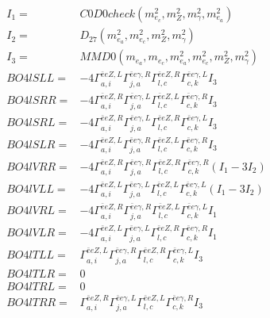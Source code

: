 \documentclass[A4,landscape]{article}
\begin{document}
\begin{align} 
I_1 = & C0D0check(m^2_{e_{{c}}}, m^2_{Z}, m^2_{\gamma}, m^2_{e_{{a}}}) \\ 
I_2 = & D_{27}(m^2_{e_{{a}}}, m^2_{e_{{c}}}, m^2_{Z}, m^2_{\gamma}) \\ 
I_3 = & MMD0(m_{e_{{a}}}, m_{e_{{c}}}, m^2_{e_{{a}}}, m^2_{e_{{c}}}, m^2_{Z}, m^2_{\gamma}) \\ 
  BO4lSLL= & -4  \Gamma^{\bar{e}e Z ,L}_{a, i} \Gamma^{\bar{e}e \gamma ,R}_{j, a} \Gamma^{\bar{e}e Z ,R}_{l, c} \Gamma^{\bar{e}e \gamma ,L}_{c, k} I_3 \\ 
  BO4lSRR= & -4  \Gamma^{\bar{e}e Z ,R}_{a, i} \Gamma^{\bar{e}e \gamma ,L}_{j, a} \Gamma^{\bar{e}e Z ,L}_{l, c} \Gamma^{\bar{e}e \gamma ,R}_{c, k} I_3 \\ 
  BO4lSRL= & -4  \Gamma^{\bar{e}e Z ,R}_{a, i} \Gamma^{\bar{e}e \gamma ,L}_{j, a} \Gamma^{\bar{e}e Z ,R}_{l, c} \Gamma^{\bar{e}e \gamma ,L}_{c, k} I_3 \\ 
  BO4lSLR= & -4  \Gamma^{\bar{e}e Z ,L}_{a, i} \Gamma^{\bar{e}e \gamma ,R}_{j, a} \Gamma^{\bar{e}e Z ,L}_{l, c} \Gamma^{\bar{e}e \gamma ,R}_{c, k} I_3 \\ 
  BO4lVRR= & -4  \Gamma^{\bar{e}e Z ,R}_{a, i} \Gamma^{\bar{e}e \gamma ,R}_{j, a} \Gamma^{\bar{e}e Z ,R}_{l, c} \Gamma^{\bar{e}e \gamma ,R}_{c, k} (I_1 - 3 I_2) \\ 
  BO4lVLL= & -4  \Gamma^{\bar{e}e Z ,L}_{a, i} \Gamma^{\bar{e}e \gamma ,L}_{j, a} \Gamma^{\bar{e}e Z ,L}_{l, c} \Gamma^{\bar{e}e \gamma ,L}_{c, k} (I_1 - 3 I_2) \\ 
  BO4lVRL= & -4  \Gamma^{\bar{e}e Z ,R}_{a, i} \Gamma^{\bar{e}e \gamma ,R}_{j, a} \Gamma^{\bar{e}e Z ,L}_{l, c} \Gamma^{\bar{e}e \gamma ,L}_{c, k} I_1 \\ 
  BO4lVLR= & -4  \Gamma^{\bar{e}e Z ,L}_{a, i} \Gamma^{\bar{e}e \gamma ,L}_{j, a} \Gamma^{\bar{e}e Z ,R}_{l, c} \Gamma^{\bar{e}e \gamma ,R}_{c, k} I_1 \\ 
  BO4lTLL= &  \Gamma^{\bar{e}e Z ,L}_{a, i} \Gamma^{\bar{e}e \gamma ,R}_{j, a} \Gamma^{\bar{e}e Z ,R}_{l, c} \Gamma^{\bar{e}e \gamma ,L}_{c, k} I_3 \\ 
  BO4lTLR= & 0 \\ 
  BO4lTRL= & 0 \\ 
  BO4lTRR= &  \Gamma^{\bar{e}e Z ,R}_{a, i} \Gamma^{\bar{e}e \gamma ,L}_{j, a} \Gamma^{\bar{e}e Z ,L}_{l, c} \Gamma^{\bar{e}e \gamma ,R}_{c, k} I_3 \\ 
\end{align} 
\end{document}
